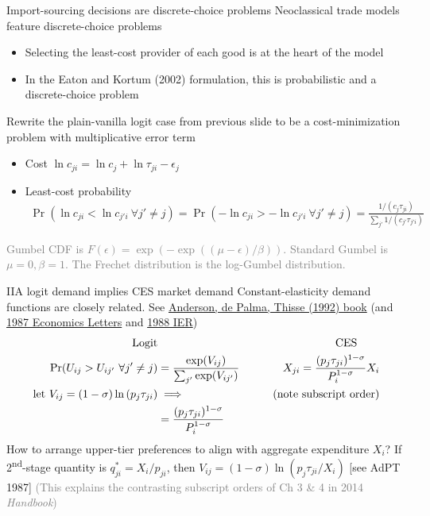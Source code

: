 \documentclass[11pt,notes=hide,aspectratio=169]{beamer}
\begin{document}
\begin{frame}{Import-sourcing decisions are discrete-choice problems}
Neoclassical trade models feature discrete-choice problems
\begin{itemize}
\item Selecting the least-cost provider of each good is at the heart of the model
\item In the Eaton and Kortum (2002) formulation, this is probabilistic and a discrete-choice problem
\end{itemize}
\smallskip
Rewrite the plain-vanilla logit case from previous slide
to be a cost-minimization problem with multiplicative error term
\begin{itemize}
	\item Cost $\ln c_{ji} = \ln c_j + \ln \tau_{ji} - \epsilon_{j}$
	\item Least-cost probability
	\begin{align*}
	\Pr(\ln c_{ji}<\ln c_{j'i} \ \forall j' \neq j)
	=
	\Pr(-\ln c_{ji}> -\ln c_{j'i} \ \forall j' \neq j)
	=
	\frac{1/(c_j\tau_{ji})}{\sum_{j'}1/(c_{j'}\tau_{j'i})}
	\end{align*}
\end{itemize}
\textcolor{gray}{Gumbel CDF is $F\left(\epsilon\right)=\exp(-\exp((\mu-\epsilon)/\beta))$. Standard Gumbel is $\mu=0,\beta=1$.}
\textcolor{gray}{The Frechet distribution is the log-Gumbel distribution.}
\end{frame}
\begin{frame}{IIA logit demand implies CES market demand}
Constant-elasticity demand functions are closely related.
See \href{https://mitpress.mit.edu/9780262011280/discrete-choice-theory-of-product-differentiation/}{Anderson, de Palma, Thisse (1992) book}
(and \href{https://doi.org/10.1016/0165-1765(87)90239-4}{1987 Economics Letters}
and \href{https://doi.org/10.2307/2526791}{1988 IER})
\begin{align*}
\text{Logit} & & \text{CES} \hfill \qquad
\\
\Pr(U_{ij}>U_{ij'} \ \forall j' \neq j) 
&=
\frac{\exp(V_{ij})}{\sum_{j'}\exp(V_{ij'})}
\qquad
&
X_{ji}
=
\frac{(p_j\tau_{ji} )^{1-\sigma}}{P_i^{1-\sigma}} X_i
\\
\text{let } V_{ij} = (1-\sigma) \ln \left(p_j\tau_{ji}\right)
& \implies
&
\textcolor{gray}{\text{(note subscript order)}}
\\
&=
\frac{(p_j\tau_{ji})^{1-\sigma}}{P_i^{1-\sigma}}
\end{align*}
How to arrange upper-tier preferences to align with aggregate expenditure $X_i$?
If 2\textsuperscript{nd}-stage quantity is $q_{ji}^{*} = X_i / p_{ji}$,
then $V_{ij} = (1-\sigma) \ln \left(p_j\tau_{ji}/X_i\right)$
[see AdPT 1987]
\smallskip
\textcolor{gray}{(This explains the contrasting subscript orders of Ch 3 \& 4 in 2014 \textit{Handbook})}
\end{frame}
\end{document}
